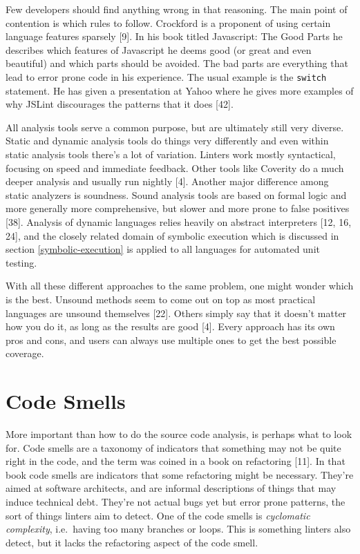 \documentclass[a4paper, 16pt, oneside]{Thesis}
\begin{document}
Few developers should find anything wrong in that reasoning. The main
point of contention is which rules to follow. Crockford is a proponent
of using certain language features sparsely {[}9{]}. In his book titled
Javascript: The Good Parts he describes which features of Javascript he
deems good (or great and even beautiful) and which parts should be
avoided. The bad parts are everything that lead to error prone code in
his experience. The usual example is the \texttt{switch} statement. He
has given a presentation at Yahoo where he gives more examples of why
JSLint discourages the patterns that it does {[}42{]}.

All analysis tools serve a common purpose, but are ultimately still very
diverse. Static and dynamic analysis tools do things very differently
and even within static analysis tools there's a lot of variation.
Linters work mostly syntactical, focusing on speed and immediate
feedback. Other tools like Coverity do a much deeper analysis and
usually run nightly {[}4{]}. Another major difference among static
analyzers is soundness. Sound analysis tools are based on formal logic
and more generally more comprehensive, but slower and more prone to
false positives {[}38{]}. Analysis of dynamic languages relies heavily
on abstract interpreters {[}12, 16, 24{]}, and the closely related
domain of symbolic execution which is discussed in section
\ref{symbolic-execution} is applied to all languages for automated unit
testing.

With all these different approaches to the same problem, one might
wonder which is the best. Unsound methods seem to come out on top as
most practical languages are unsound themselves {[}22{]}. Others simply
say that it doesn't matter how you do it, as long as the results are
good {[}4{]}. Every approach has its own pros and cons, and users can
always use multiple ones to get the best possible coverage.

\section{Code Smells}\label{code-smells}

More important than how to do the source code analysis, is perhaps what
to look for. Code smells are a taxonomy of indicators that something may
not be quite right in the code, and the term was coined in a book on
refactoring {[}11{]}. In that book code smells are indicators that some
refactoring might be necessary. They're aimed at software architects,
and are informal descriptions of things that may induce technical debt.
They're not actual bugs yet but error prone patterns, the sort of things
linters aim to detect. One of the code smells is \emph{cyclomatic
complexity}, i.e.~having too many branches or loops. This is something
linters also detect, but it lacks the refactoring aspect of the code
smell.
\end{document}
